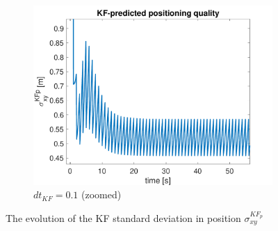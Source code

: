 \documentclass{article}
\begin{document}
\begin{figure}[H]
\begin{subfigure}[t]{0.49\textwidth}
        \includegraphics[width=\textwidth]{dt01/sigma_KFp_zoom}
        \caption{$dt_{KF} = 0.1$ (zoomed)}
    \end{subfigure}
    \caption{The evolution of the KF standard deviation in position $\sigma_{xy}^{KF_{p}}$}
    \label{fig:traj_motion_noise}
\end{figure}
\end{document}

